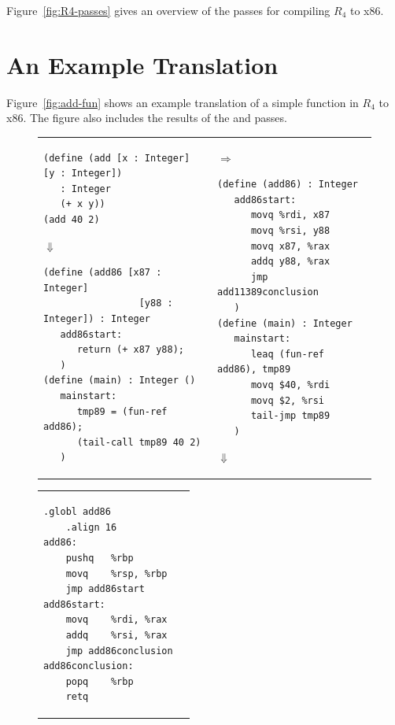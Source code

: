 \documentclass[11pt]{book}
\begin{document}
Figure~\ref{fig:R4-passes} gives an overview of the passes for
compiling $R_4$ to x86.

\section{An Example Translation}
\label{sec:functions-example}

Figure~\ref{fig:add-fun} shows an example translation of a simple
function in $R_4$ to x86. The figure also includes the results of the
 and  passes.

\begin{figure}[htbp]
\begin{tabular}{ll}
\begin{minipage}{0.5\textwidth}
\begin{lstlisting}[basicstyle=\ttfamily\scriptsize]
(define (add [x : Integer] [y : Integer])
   : Integer
   (+ x y))
(add 40 2)
\end{lstlisting}
$\Downarrow$
\begin{lstlisting}[basicstyle=\ttfamily\scriptsize]
(define (add86 [x87 : Integer]
                 [y88 : Integer]) : Integer
   add86start:
      return (+ x87 y88);
   )
(define (main) : Integer ()
   mainstart:
      tmp89 = (fun-ref add86);
      (tail-call tmp89 40 2)
   )
\end{lstlisting}
\end{minipage}
&
$\Rightarrow$
\begin{minipage}{0.5\textwidth}
\begin{lstlisting}[basicstyle=\ttfamily\scriptsize]
(define (add86) : Integer
   add86start:
      movq %rdi, x87
      movq %rsi, y88
      movq x87, %rax
      addq y88, %rax
      jmp add11389conclusion
   )
(define (main) : Integer
   mainstart:
      leaq (fun-ref add86), tmp89
      movq $40, %rdi
      movq $2, %rsi
      tail-jmp tmp89
   )
\end{lstlisting}
$\Downarrow$
\end{minipage}
\end{tabular}
\begin{tabular}{ll}
\begin{minipage}{0.3\textwidth}
\begin{lstlisting}[basicstyle=\ttfamily\scriptsize]
	.globl add86
	.align 16
add86:
	pushq	%rbp
	movq	%rsp, %rbp
	jmp	add86start
add86start:
	movq	%rdi, %rax
	addq	%rsi, %rax
	jmp add86conclusion
add86conclusion:
	popq	%rbp
	retq
\end{lstlisting}

\end{minipage}
\end{tabular}
\end{figure}
\end{document}
